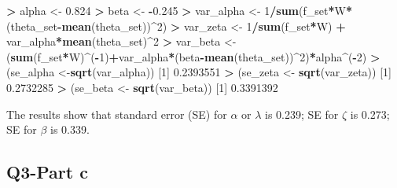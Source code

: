 \documentclass[
]{article}
\newenvironment{Shaded}{\begin{snugshade}}{\end{snugshade}}
\newcommand{\DecValTok}[1]{\textcolor[rgb]{0.00,0.00,0.81}{#1}}
\newcommand{\FloatTok}[1]{\textcolor[rgb]{0.00,0.00,0.81}{#1}}
\newcommand{\FunctionTok}[1]{\textcolor[rgb]{0.13,0.29,0.53}{\textbf{#1}}}
\newcommand{\NormalTok}[1]{#1}
\newcommand{\OtherTok}[1]{\textcolor[rgb]{0.56,0.35,0.01}{#1}}
\newcommand{\SpecialCharTok}[1]{\textcolor[rgb]{0.81,0.36,0.00}{\textbf{#1}}}
\begin{document}
\begin{Shaded}
\begin{Highlighting}[]
\SpecialCharTok{\textgreater{}}\NormalTok{ alpha }\OtherTok{\textless{}{-}} \FloatTok{0.824}
\SpecialCharTok{\textgreater{}}\NormalTok{ beta }\OtherTok{\textless{}{-}} \SpecialCharTok{{-}}\FloatTok{0.245}
\SpecialCharTok{\textgreater{}}\NormalTok{ var\_alpha }\OtherTok{\textless{}{-}} \DecValTok{1}\SpecialCharTok{/}\FunctionTok{sum}\NormalTok{(f\_set}\SpecialCharTok{*}\NormalTok{W}\SpecialCharTok{*}\NormalTok{(theta\_set}\SpecialCharTok{{-}}\FunctionTok{mean}\NormalTok{(theta\_set))}\SpecialCharTok{\^{}}\DecValTok{2}\NormalTok{)}
\SpecialCharTok{\textgreater{}}\NormalTok{ var\_zeta }\OtherTok{\textless{}{-}} \DecValTok{1}\SpecialCharTok{/}\FunctionTok{sum}\NormalTok{(f\_set}\SpecialCharTok{*}\NormalTok{W) }\SpecialCharTok{+}\NormalTok{ var\_alpha}\SpecialCharTok{*}\FunctionTok{mean}\NormalTok{(theta\_set)}\SpecialCharTok{\^{}}\DecValTok{2}
\SpecialCharTok{\textgreater{}}\NormalTok{ var\_beta }\OtherTok{\textless{}{-}}\NormalTok{ (}\FunctionTok{sum}\NormalTok{(f\_set}\SpecialCharTok{*}\NormalTok{W)}\SpecialCharTok{\^{}}\NormalTok{(}\SpecialCharTok{{-}}\DecValTok{1}\NormalTok{)}\SpecialCharTok{+}\NormalTok{var\_alpha}\SpecialCharTok{*}\NormalTok{(beta}\SpecialCharTok{{-}}\FunctionTok{mean}\NormalTok{(theta\_set))}\SpecialCharTok{\^{}}\DecValTok{2}\NormalTok{)}\SpecialCharTok{*}\NormalTok{alpha}\SpecialCharTok{\^{}}\NormalTok{(}\SpecialCharTok{{-}}\DecValTok{2}\NormalTok{)}
\SpecialCharTok{\textgreater{}}\NormalTok{ (se\_alpha }\OtherTok{\textless{}{-}}\FunctionTok{sqrt}\NormalTok{(var\_alpha))}
\NormalTok{[}\DecValTok{1}\NormalTok{] }\FloatTok{0.2393551}
\SpecialCharTok{\textgreater{}}\NormalTok{ (se\_zeta }\OtherTok{\textless{}{-}} \FunctionTok{sqrt}\NormalTok{(var\_zeta))}
\NormalTok{[}\DecValTok{1}\NormalTok{] }\FloatTok{0.2732285}
\SpecialCharTok{\textgreater{}}\NormalTok{ (se\_beta }\OtherTok{\textless{}{-}} \FunctionTok{sqrt}\NormalTok{(var\_beta))}
\NormalTok{[}\DecValTok{1}\NormalTok{] }\FloatTok{0.3391392}
\end{Highlighting}
\end{Shaded}

The results show that standard error (SE) for \(\alpha\) or \(\lambda\)
is 0.239; SE for \(\zeta\) is 0.273; SE for \(\beta\) is 0.339.

\hypertarget{q3-part-c}{%
\subsection{Q3-Part c}\label{q3-part-c}}
\end{document}
